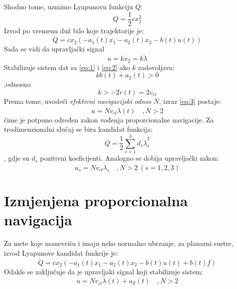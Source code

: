 Shodno tome, uzmimo Lyapunovu funkciju $Q$:
\begin{equation}
    Q=\frac{1}{2}cx_2^2
\end{equation}
Izvod po vremenu duž bilo koje trajektorije je:
\begin{equation}
    \dot{Q}=cx_2(-a_1(t)x_1-a_2(t)x_2-b(t)u(t))
\end{equation}
Sada se vidi da upravljački signal 
\begin{equation}
    u=kx_2=k\dot{\lambda}
    \label{eq:3}
\end{equation}
Stabilizuje sistem dat sa \ref{eq:1} i \ref{eq:2} ako $k$ zadovoljava:
\begin{equation}
    kb(t)+a_2(t)>0
\end{equation}
,odnosno \begin{equation}
    k>-2\dot{r}(t)=2v_{cl}
\end{equation}
Prema tome, uvodeći \textit{efektivni navigacijski odnos} $N$, izraz \ref{eq:3} postaje:
\begin{equation}
    u=Nv_{cl}\dot{\lambda}(t) \quad ,N>2
\end{equation}
čime je potpuno određen zakon vođenja proporcionalne navigacije.
Za trodimenzionalni slučaj se bira kandidat funkcija:
\begin{equation}
    Q=\frac{1}{2}\sum_{s=1}^3d_s\dot{\lambda}_s^2
\end{equation}
, gdje su $d_s$ pozitivni koeficijenti. Analogno se dobija upravljački zakon:
\begin{equation}
    u_s=Nv_{cl}\dot{\lambda}_s \quad ,N>2\ (s=1,2,3)
\end{equation}

\section{Izmjenjena proporcionalna navigacija}
Za mete koje manevrišu i imaju neko normalno ubrzanje, za planarni sustre, izvod Lyapunove kandidat 
funkcije je:
\begin{equation}
    \dot{Q}=cx_2(-a_1(t)x_1-a_2(t)x_2-b(t)u(t)+b(t)f)
\end{equation}
Odakle se zaključuje da je upravljaki signal koji stabilizuje sistem:
\begin{equation}
    u=Nv_{cl}\dot{\lambda}(t)+a_T(t) \quad ,N>2
\end{equation}
